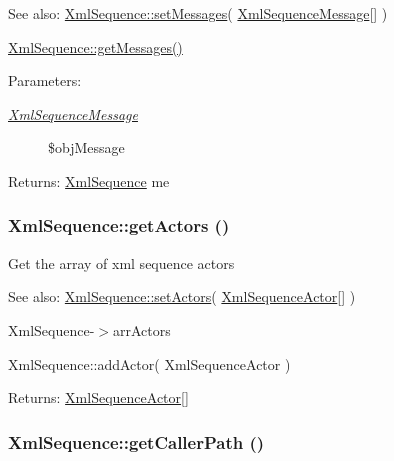 \begin{Desc}
\item[See also:]\hyperlink{class_xml_sequence_3cf549fbc588fc2bc0bbd74f818dfe91}{XmlSequence::setMessages}( \hyperlink{class_xml_sequence_message}{XmlSequenceMessage}\mbox{[}\mbox{]} ) 

\hyperlink{class_xml_sequence_21cc38a9b7b19954bb0b8951b065ad11}{XmlSequence::getMessages()} \end{Desc}
\begin{Desc}
\item[Parameters:]
\begin{description}
\item[{\em \hyperlink{class_xml_sequence_message}{XmlSequenceMessage}}]\$objMessage \end{description}
\end{Desc}
\begin{Desc}
\item[Returns:]\hyperlink{class_xml_sequence}{XmlSequence} me \end{Desc}
\hypertarget{class_xml_sequence_dcce8335021177bac08889348f2a508e}{
\subsubsection[{getActors}]{\setlength{\rightskip}{0pt plus 5cm}XmlSequence::getActors ()}}
\label{class_xml_sequence_dcce8335021177bac08889348f2a508e}


Get the array of xml sequence actors

\begin{Desc}
\item[See also:]\hyperlink{class_xml_sequence_00aa28e395a3d00b7b15b1adebe092db}{XmlSequence::setActors}( \hyperlink{class_xml_sequence_actor}{XmlSequenceActor}\mbox{[}\mbox{]} ) 

XmlSequence-$>$arrActors 

XmlSequence::addActor( XmlSequenceActor ) \end{Desc}
\begin{Desc}
\item[Returns:]\hyperlink{class_xml_sequence_actor}{XmlSequenceActor}\mbox{[}\mbox{]} \end{Desc}
\hypertarget{class_xml_sequence_197ff62ed0c4d22324218206147f25e4}{
\subsubsection[{getCallerPath}]{\setlength{\rightskip}{0pt plus 5cm}XmlSequence::getCallerPath ()}}
\label{class_xml_sequence_197ff62ed0c4d22324218206147f25e4}


